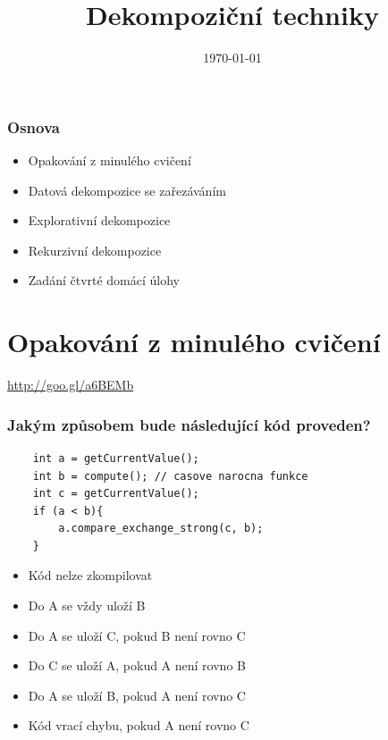 \documentclass[usenames,dvipsnames,9pt]{beamer}
\title{Dekompoziční techniky}
\date{\today}
\institute{B4B36PDV -- Paralelní a distribuované výpočty}
\begin{document}
\maketitle


%  
%
%
%

\begin{frame}
  \frametitle{Osnova}
  \begin{itemize}
    \item Opakování z minulého cvičení
    \item Datová dekompozice se zařezáváním
    \item Explorativní dekompozice
    \item Rekurzivní dekompozice\\[1.5em]
    \item Zadání čtvrté domácí úlohy
  \end{itemize}
\end{frame}

\section{Opakování z minulého cvičení}
\begin{frame}[standout]
  \Huge
  \url{http://goo.gl/a6BEMb}
\end{frame}

\begin{frame}[fragile]

\frametitle{Jakým způsobem bude následující kód proveden?}

	\begin{verbatim}
	int a = getCurrentValue();
	int b = compute(); // casove narocna funkce
	int c = getCurrentValue();
	if (a < b){
		a.compare_exchange_strong(c, b);
	}
	\end{verbatim}
	
	\vspace{2em}
	\begin{itemize}
	\item Kód nelze zkompilovat
	\item Do A se vždy uloží B
	\item Do A se uloží C, pokud B není rovno C
	\item Do C se uloží A, pokud A není rovno B
	\item Do A se uloží B, pokud A není rovno C
	\item Kód vrací chybu, pokud A není rovno C
	\end{itemize}

\end{frame}
\end{document}
